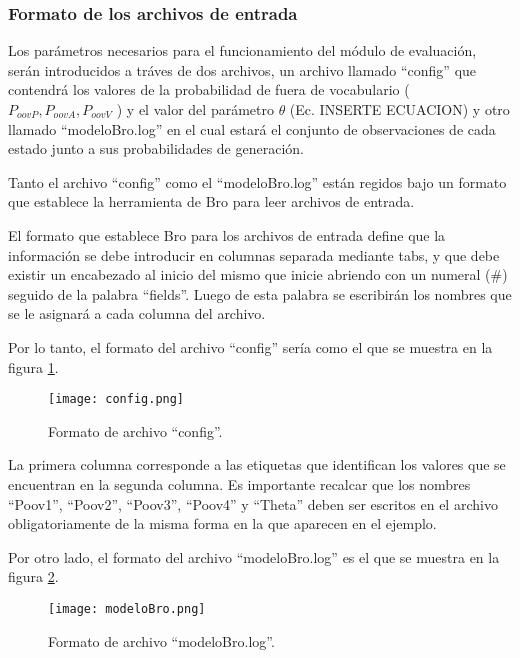 \subsubsection*{Formato de los archivos de entrada}

    Los parámetros necesarios para el funcionamiento del módulo de evaluación, serán introducidos a tráves de dos archivos, un archivo llamado
``config'' que contendrá los valores de la probabilidad de fuera de vocabulario ($P_{oovP}, P_{oovA}, P_{oovV}$ ) y el valor del parámetro $\theta$ (Ec. INSERTE ECUACION) y otro llamado
``modeloBro.log'' en el cual estará el conjunto de observaciones de cada estado junto a sus probabilidades de generación.
   
Tanto el archivo ``config'' como el ``modeloBro.log'' están regidos bajo un formato que establece la herramienta de Bro para leer archivos de entrada.

El formato que establece Bro para los archivos de entrada define que la información se debe introducir en columnas separada mediante tabs, y que debe existir un encabezado al inicio del mismo que inicie abriendo con un numeral (\#) seguido de la palabra ``fields''. Luego de esta palabra se escribirán los nombres que se le asignará a cada columna del archivo.

Por lo tanto, el formato del archivo ``config'' sería como el que se muestra en la figura \ref{fig:archivoConfig}.

\begin{figure}[tb]
\begin{center}
\texttt{[image: config.png]}
\caption{Formato de archivo ``config''.}
\label{fig:archivoConfig}
\end{center}
\end{figure}	

La primera columna corresponde a las etiquetas que identifican los valores que se encuentran en la segunda columna. Es importante recalcar que los nombres ``Poov1'', ``Poov2'', ``Poov3'', ``Poov4'' y ``Theta'' deben ser escritos en el archivo obligatoriamente de la misma forma en la que aparecen en el ejemplo.

Por otro lado, el formato del archivo ``modeloBro.log'' es el que se muestra en la figura \ref{fig:archivoModeloBro}.

\begin{figure}[tb]
\begin{center}
\texttt{[image: modeloBro.png]}
\caption{Formato de archivo ``modeloBro.log''.}
\label{fig:archivoModeloBro}
\end{center}
\end{figure}	

